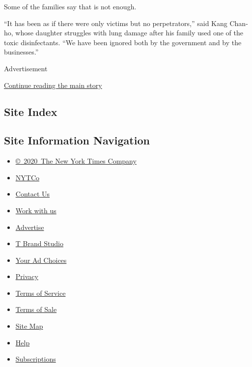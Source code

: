 Some of the families say that is not enough.

``It has been as if there were only victims but no perpetrators,'' said
Kang Chan-ho, whose daughter struggles with lung damage after his family
used one of the toxic disinfectants. ``We have been ignored both by the
government and by the businesses.''

Advertisement

\protect\hyperlink{after-bottom}{Continue reading the main story}

\hypertarget{site-index}{%
\subsection{Site Index}\label{site-index}}

\hypertarget{site-information-navigation}{%
\subsection{Site Information
Navigation}\label{site-information-navigation}}

\begin{itemize}
\tightlist
\item
  \href{https://help.nytimes3xbfgragh.onion/hc/en-us/articles/115014792127-Copyright-notice}{©~2020~The
  New York Times Company}
\end{itemize}

\begin{itemize}
\tightlist
\item
  \href{https://www.nytco.com/}{NYTCo}
\item
  \href{https://help.nytimes3xbfgragh.onion/hc/en-us/articles/115015385887-Contact-Us}{Contact
  Us}
\item
  \href{https://www.nytco.com/careers/}{Work with us}
\item
  \href{https://nytmediakit.com/}{Advertise}
\item
  \href{http://www.tbrandstudio.com/}{T Brand Studio}
\item
  \href{https://www.nytimes3xbfgragh.onion/privacy/cookie-policy\#how-do-i-manage-trackers}{Your
  Ad Choices}
\item
  \href{https://www.nytimes3xbfgragh.onion/privacy}{Privacy}
\item
  \href{https://help.nytimes3xbfgragh.onion/hc/en-us/articles/115014893428-Terms-of-service}{Terms
  of Service}
\item
  \href{https://help.nytimes3xbfgragh.onion/hc/en-us/articles/115014893968-Terms-of-sale}{Terms
  of Sale}
\item
  \href{https://spiderbites.nytimes3xbfgragh.onion}{Site Map}
\item
  \href{https://help.nytimes3xbfgragh.onion/hc/en-us}{Help}
\item
  \href{https://www.nytimes3xbfgragh.onion/subscription?campaignId=37WXW}{Subscriptions}
\end{itemize}
